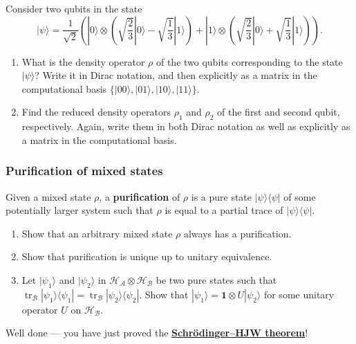 \documentclass[fleqn]{article}
\begin{document}
Consider two qubits in the state
\[
  |\psi\rangle =
  \frac{1}{\sqrt{2}}\left(
    |0\rangle\otimes\left(
      \sqrt{\frac23}|0\rangle
      - \sqrt{\frac13}|1\rangle
    \right)
    + |1\rangle\otimes\left(
      \sqrt{\frac23}|0\rangle
      + \sqrt{\frac13}|1\rangle
    \right)
  \right).
\]

\begin{enumerate}
\def\labelenumi{\arabic{enumi}.}
\item
  What is the density operator \(\rho\) of the two qubits corresponding to the state \(|\psi\rangle\)?
  Write it in Dirac notation, and then explicitly as a matrix in the computational basis \(\{|00\rangle,|01\rangle,|10\rangle,|11\rangle\}\).
\item
  Find the reduced density operators \(\rho_1\) and \(\rho_2\) of the first and second qubit, respectively.
  Again, write them in both Dirac notation as well as explicitly as a matrix in the computational basis.
\end{enumerate}

\hypertarget{purification-of-mixed-states}{%
\subsubsection{Purification of mixed states}\label{purification-of-mixed-states}}

Given a mixed state \(\rho\), a \textbf{purification} of \(\rho\) is a pure state \(|\psi\rangle\langle\psi|\) of some potentially larger system such that \(\rho\) is equal to a partial trace of \(|\psi\rangle\langle\psi|\).

\begin{enumerate}
\def\labelenumi{\arabic{enumi}.}
\item
  Show that an arbitrary mixed state \(\rho\) always has a purification.
\item
  Show that purification is unique up to unitary equivalence.
\item
  Let \(|\psi_1\rangle\) and \(|\psi_2\rangle\) in \(\mathcal{H}_{\mathcal{A}}\otimes\mathcal{H}_{\mathcal{B}}\) be two pure states such that \(\operatorname{tr}_{\mathcal{B}}|\psi_1\rangle\langle\psi_1| = \operatorname{tr}_{\mathcal{B}}|\psi_2\rangle\langle\psi_2|\).
  Show that \(|\psi_1\rangle = \mathbf{1}\otimes U|\psi_2\rangle\) for some unitary operator \(U\) on \(\mathcal{H}_{\mathcal{B}}\).
\end{enumerate}

Well done --- you have just proved the \href{https://en.wikipedia.org/wiki/Schr\%C3\%B6dinger\%E2\%80\%93HJW_theorem}{\textbf{Schrödinger--HJW theorem}}!
\end{document}
